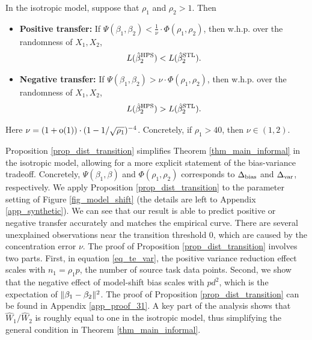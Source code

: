 \begin{proposition}\label{prop_dist_transition}
	In the isotropic model, suppose that $\rho_1$ and $\rho_2 > 1$.
	Then
	\begin{itemize}
		\item \textbf{Positive transfer:} If $\Psi(\beta_1, \beta_2) < \frac{1}{\nu} \cdot  \Phi(\rho_1, \rho_2)$, then w.h.p. over the randomness of $X_1,X_2$,
			\[ L(\hat{\beta}_2^{\textup{HPS}}) < L(\hat{\beta}_2^{\textup{STL}}). \]
		\item \textbf{Negative transfer:} If $\Psi(\beta_1, \beta_2) > {\nu} \cdot  \Phi(\rho_1, \rho_2)$, then w.h.p. over the randomness of $X_1,X_2$,
			$$L(\hat{\beta}_2^{\textup{HPS}}) > L(\hat{\beta}_2^{\textup{STL}}).$$
	\end{itemize}
	Here {\small$\nu = (1+\operatorname{o}(1)) \cdot (1 - 1/\sqrt{\rho_1})^{-4}$}.
	Concretely, if $\rho_1 > 40$, then $\nu\in (1,2)$.
\end{proposition}


Proposition \ref{prop_dist_transition} simplifies Theorem \ref{thm_main_informal} in the isotropic model, allowing for a more explicit statement of the bias-variance tradeoff.
Concretely, $\Psi(\beta_1, \beta)$ and $\Phi(\rho_1, \rho_2)$ corresponds to $\Delta_{\text{bias}}$ and $\Delta_{\text{var}}$, respectively.
We apply Proposition \ref{prop_dist_transition} to the parameter setting of Figure \ref{fig_model_shift} (the details are left to Appendix \ref{app_synthetic}).
We can see that our result is able to predict positive or negative transfer  accurately and matches the empirical curve.
There are several unexplained observations near the transition threshold $0$, which are caused by the concentration error $\nu$.
The proof of Proposition \ref{prop_dist_transition} involves two parts.
First, in equation \eqref{eq_te_var}, the positive variance reduction effect scales with $n_1 = \rho_1 p$, the number of source task data points.
Second, we show that the negative effect of model-shift bias scales with $pd^2$, which is the expectation of $\|\beta_1 - \beta_2\|^2$.
The proof of Proposition \ref{prop_dist_transition} can be found in Appendix \ref{app_proof_31}.
A key part of the analysis shows that $\hat{W}_1 / \hat{W}_2$ is roughly equal to one in the isotropic model,
thus simplifying the general condition in Theorem \ref{thm_main_informal}.

